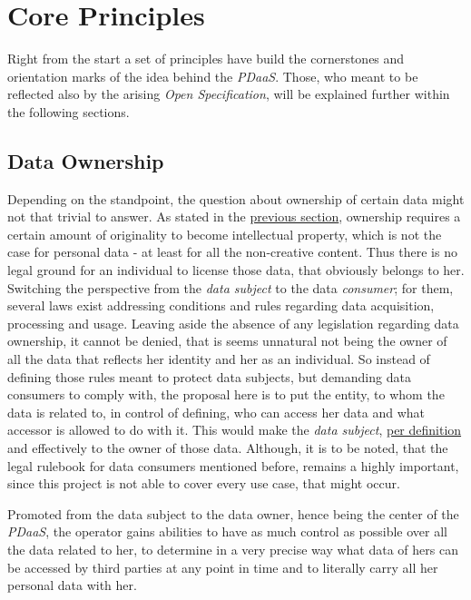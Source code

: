 \documentclass[12pt,english,a4paper,titlepage,cleardoublepage=empty,dottedtoc]{report}
\begin{document}
\hypertarget{core-principles}{\chapter{Core
Principles}\label{core-principles}}

Right from the start a set of principles have build the cornerstones and
orientation marks of the idea behind the \emph{PDaaS}. Those, who meant
to be reflected also by the arising \emph{Open Specification}, will be
explained further within the following sections.

\section{Data Ownership}\label{data-ownership}

Depending on the standpoint, the question about ownership of certain
data might not that trivial to answer. As stated in the
\protect\hyperlink{digital-identity-personal-data-and-ownership}{previous
section}, ownership requires a certain amount of originality to become
intellectual property, which is not the case for personal data - at
least for all the non-creative content. Thus there is no legal ground
for an individual to license those data, that obviously belongs to her.
Switching the perspective from the \emph{data subject} to the data
\emph{consumer}; for them, several laws exist addressing conditions and
rules regarding data acquisition, processing and usage. Leaving aside
the absence of any legislation regarding data ownership, it cannot be
denied, that is seems unnatural not being the owner of all the data that
reflects her identity and her as an individual. So instead of defining
those rules meant to protect data subjects, but demanding data consumers
to comply with, the proposal here is to put the entity, to whom the data
is related to, in control of defining, who can access her data and what
accessor is allowed to do with it. This would make the \emph{data
subject}, \protect\hyperlink{def-ownership}{per definition} and
effectively to the owner of those data. Although, it is to be noted,
that the legal rulebook for data consumers mentioned before, remains a
highly important, since this project is not able to cover every use
case, that might occur.

Promoted from the data subject to the data owner, hence being the center
of the \emph{PDaaS}, the operator gains abilities to have as much
control as possible over all the data related to her, to determine in a
very precise way what data of hers can be accessed by third parties at
any point in time and to literally carry all her personal data with her.
\end{document}
